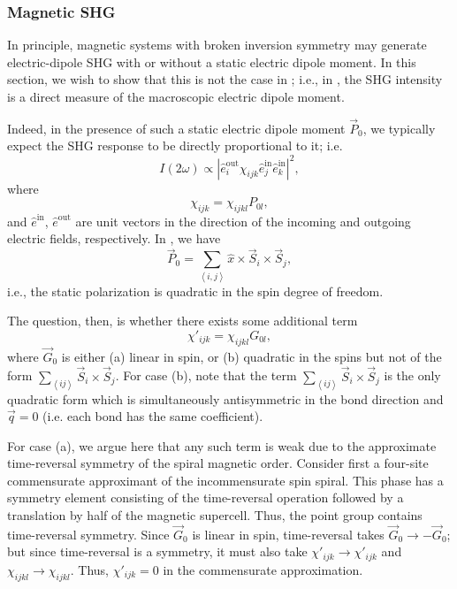\subsubsection{Magnetic SHG}\label{cubrtwo-sup:magshg}

In principle, magnetic systems with broken inversion symmetry may generate electric-dipole SHG with or without a static electric dipole moment.
In this section, we wish to show that this is not the case in ; i.e., in , the SHG intensity is a direct measure of the macroscopic electric dipole moment.

Indeed, in the presence of such a static electric dipole moment $\vec{P}_0$, we typically expect the SHG response to be directly proportional to it; i.e.
\begin{equation}\label{cubrtwo-eq:shgintensityequation}
I(2\omega) \propto |\hat{e}^\mathrm{out}_i \chi_{ijk} \hat{e}^\mathrm{in}_j \hat{e}^\mathrm{in}_k|^2,
\end{equation}
where
\begin{equation}\label{cubrtwo-eq:susceptibilityshortform}
\chi_{ijk} = \chi_{ijkl} P_{0l},
\end{equation}
and $\hat{e}^\mathrm{in}$, $\hat{e}^\mathrm{out}$ are unit vectors in the direction of the incoming and outgoing electric fields, respectively.
In , we have  
\begin{equation}
\vec{P}_0 = \sum\limits_{\left<i, j\right>} \hat{x} \times \vec{S}_i \times \vec{S}_j,
\end{equation}
i.e., the static polarization is quadratic in the spin degree of freedom.

The question, then, is whether there exists some additional term
\begin{equation}
\chi'_{ijk} = \chi_{ijkl} G_{0l},
\end{equation}
where $\vec{G}_0$ is either (a) linear in spin, or (b) quadratic in the spins but not of the form $\sum_{\left<ij\right>}\vec{S}_i\times\vec{S}_j$.
For case (b), note that the term $\sum_{\left<ij\right>}\vec{S}_i\times\vec{S}_j$ is the only quadratic form which is simultaneously antisymmetric in the bond direction and $\vec{q}=0$ (i.e. each bond has the same coefficient).

For case (a), we argue here that any such term is weak due to the approximate time-reversal symmetry of the spiral magnetic order.
Consider first a four-site commensurate approximant of the incommensurate spin spiral.
This phase has a symmetry element consisting of the time-reversal operation followed by a translation by half of the magnetic supercell.
Thus, the point group contains time-reversal symmetry.
Since $\vec{G}_0$ is linear in spin, time-reversal takes $\vec{G}_0\rightarrow-\vec{G}_0$; but since time-reversal is a symmetry, it must also take $\chi'_{ijk}\rightarrow\chi'_{ijk}$ and $\chi_{ijkl}\rightarrow\chi_{ijkl}$.
Thus, $\chi'_{ijk}=0$ in the commensurate approximation.

